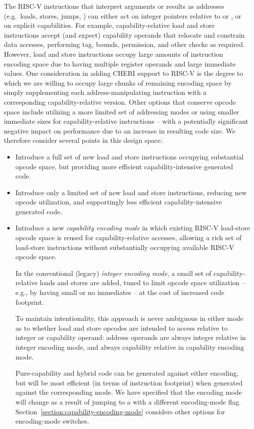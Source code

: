 The RISC-V instructions that interpret arguments or results as addresses
(e.g.\ loads, stores, jumps, ) can either act on integer pointers
relative to \DDC{} or \PCC{}, or on explicit capabilities.
For example, capability-relative load and store instructions accept (and expect) capability
operands that relocate and constrain data accesses, performing tag, bounds,
permission, and other checks as required.
However, load and store instructions occupy large amounts of instruction
encoding space due to having multiple register operands and large immediate
values.
One consideration in adding CHERI support to RISC-V is the degree to which we
are willing to occupy large chunks of remaining encoding space by simply
supplementing each address-manipulating instruction with a
corresponding capability-relative version.
Other options that conserve opcode space include utilizing a more limited set
of addressing modes or using smaller immediate sizes for capability-relative
instructions -- with a potentially significant negative impact on performance
due to an increase in resulting code size.
We therefore consider several points in this design space:

\begin{itemize}
\item Introduce a full set of new load and store instructions occupying
  substantial opcode space, but providing more efficient capability-intensive
  generated code.

\item Introduce only a limited set of new load and store instructions,
  reducing new opcode utilization, and supportingly less efficient
  capability-intensive generated code.

\item Introduce a new \textit{capability encoding mode} in which
  existing RISC-V load-store opcode space is reused for capability-relative
  accesses, allowing a rich set of load-store instructions without
  substantially occupying available RISC-V opcode space.

  In the conventional (legacy) \textit{integer encoding mode}, a small set of
  capability-relative loads and stores are added, tuned to limit opcode
  space utilization -- e.g., by having small or no immediates -- at the cost
  of increased code footprint.

  To maintain intentionality, this approach is never ambiguous in either mode
  as to whether load and store opcodes are intended to access relative to
  integer or capability operand: address operands are always integer relative
  in integer encoding mode, and always capability relative in capability
  encoding mode.

  Pure-capability and hybrid code can be generated against either encoding,
  but will be most efficient (in terms of instruction footprint) when
  generated against the corresponding mode.
  We have specified that the encoding mode will change as a result of jumping
  to a \PCC{} with a different encoding-mode flag.
  Section~\ref{section:capability-encoding-mode} considers other options for
  encoding-mode switches.
\end{itemize}

